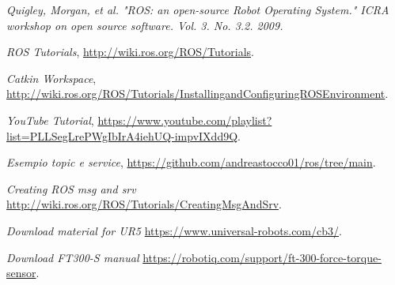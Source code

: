 \begin{thebibliography}{99}

 \textit{Quigley, Morgan, et al. "ROS: an open-source Robot Operating System." ICRA workshop on open source software. 
Vol. 3. No. 3.2. 2009.}

 \textit{ROS Tutorials}, \url{http://wiki.ros.org/ROS/Tutorials}.

 \textit{Catkin Workspace}, \url{http://wiki.ros.org/ROS/Tutorials/InstallingandConfiguringROSEnvironment}.

 \textit{YouTube Tutorial}, \url{https://www.youtube.com/playlist?list=PLLSegLrePWgIbIrA4iehUQ-impvIXdd9Q}.

 \textit{Esempio topic e service}, \url{https://github.com/andreastocco01/ros/tree/main}.

 \textit{Creating ROS msg and srv} \url{http://wiki.ros.org/ROS/Tutorials/CreatingMsgAndSrv}.

 \textit{Download material for UR5} \url{https://www.universal-robots.com/cb3/}.

 \textit{Download FT300-S manual} \url{https://robotiq.com/support/ft-300-force-torque-sensor}.
\end{thebibliography}